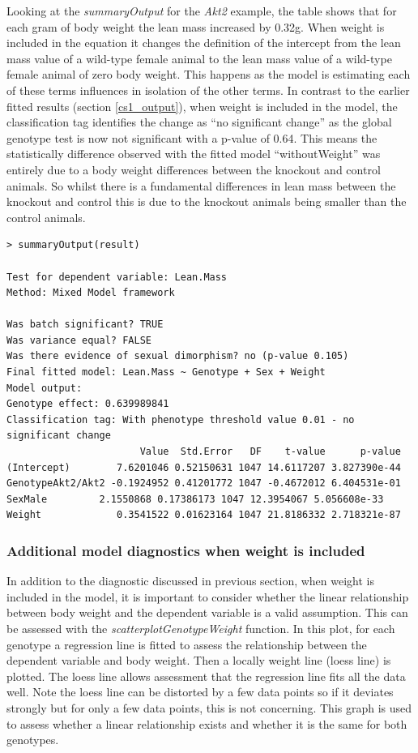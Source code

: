 \documentclass[12pt,a4paper]{article}
\begin{document}
Looking at the \textit{summaryOutput} for the \textit{Akt2} example, the table shows that for each gram of body weight the lean mass increased by 0.32g.  
When weight is included in the equation it changes the definition of the intercept from the lean mass value of a wild-type female animal to the lean mass value of a wild-type female animal of zero body weight. 
This happens as the model is estimating each of these terms influences in isolation of the other terms. 
In contrast to the earlier fitted results (section \ref{cs1_output}), when weight is included in the model, the classification tag identifies the change as “no significant change” 
as the global genotype test is now not significant with a p-value of 0.64.  
This means the statistically difference observed with the fitted model “withoutWeight” was entirely due to a body weight differences between the knockout and control animals.  
So whilst there is a fundamental differences in lean mass between the knockout and control this is due to the knockout animals being smaller than the control animals. 

\begingroup
    \fontsize{8pt}{12pt}\selectfont
\begin{verbatim}
> summaryOutput(result)

Test for dependent variable: Lean.Mass
Method: Mixed Model framework

Was batch significant? TRUE
Was variance equal? FALSE
Was there evidence of sexual dimorphism? no (p-value 0.105)
Final fitted model: Lean.Mass ~ Genotype + Sex + Weight
Model output:
Genotype effect: 0.639989841
Classification tag: With phenotype threshold value 0.01 - no significant change
                       Value  Std.Error   DF    t-value      p-value
(Intercept)        7.6201046 0.52150631 1047 14.6117207 3.827390e-44
GenotypeAkt2/Akt2 -0.1924952 0.41201772 1047 -0.4672012 6.404531e-01
SexMale         2.1550868 0.17386173 1047 12.3954067 5.056608e-33
Weight             0.3541522 0.01623164 1047 21.8186332 2.718321e-87

\end{verbatim}
\endgroup


\subsubsection{Additional model diagnostics when weight is included}
In addition to the diagnostic discussed in previous section, when weight is included in the model, it is important to consider whether the linear relationship between body weight and the dependent variable is a valid assumption. 
This can be assessed with the \textit{scatterplotGenotypeWeight} function. 
In this plot, for each genotype a regression line is fitted to assess the relationship between the dependent variable and body weight. 
Then a locally weight line (loess line) is plotted. 
The loess line allows assessment that the regression line fits all the data well.
Note the loess line can be distorted by a few data points so if it deviates strongly but for only a few data points, this is not concerning.  
This graph is used to assess whether a linear relationship exists and whether it is the same for both genotypes.  
\end{document}

